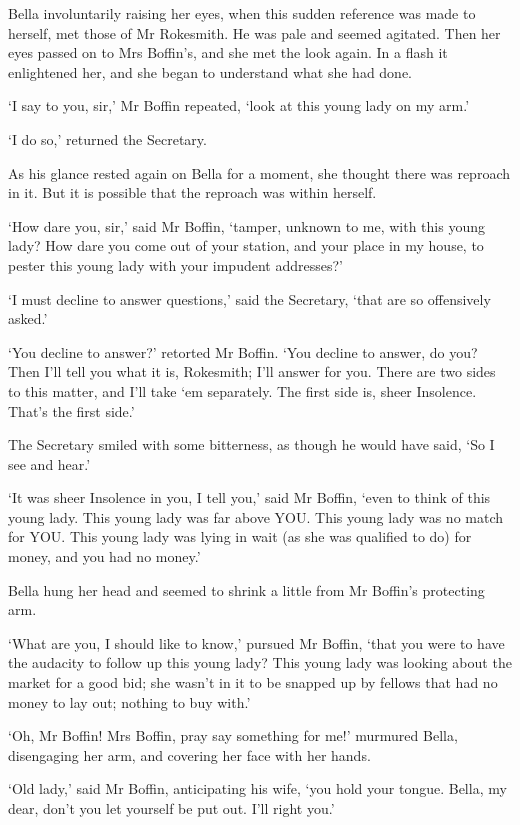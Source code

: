Bella involuntarily raising her eyes, when this sudden reference was
made to herself, met those of Mr Rokesmith. He was pale and seemed
agitated. Then her eyes passed on to Mrs Boffin’s, and she met the look
again. In a flash it enlightened her, and she began to understand what
she had done.

‘I say to you, sir,’ Mr Boffin repeated, ‘look at this young lady on my
arm.’

‘I do so,’ returned the Secretary.

As his glance rested again on Bella for a moment, she thought there was
reproach in it. But it is possible that the reproach was within herself.

‘How dare you, sir,’ said Mr Boffin, ‘tamper, unknown to me, with this
young lady? How dare you come out of your station, and your place in my
house, to pester this young lady with your impudent addresses?’

‘I must decline to answer questions,’ said the Secretary, ‘that are so
offensively asked.’

‘You decline to answer?’ retorted Mr Boffin. ‘You decline to answer,
do you? Then I’ll tell you what it is, Rokesmith; I’ll answer for you.
There are two sides to this matter, and I’ll take ‘em separately. The
first side is, sheer Insolence. That’s the first side.’

The Secretary smiled with some bitterness, as though he would have said,
‘So I see and hear.’

‘It was sheer Insolence in you, I tell you,’ said Mr Boffin, ‘even to
think of this young lady. This young lady was far above YOU. This young
lady was no match for YOU. This young lady was lying in wait (as she was
qualified to do) for money, and you had no money.’

Bella hung her head and seemed to shrink a little from Mr Boffin’s
protecting arm.

‘What are you, I should like to know,’ pursued Mr Boffin, ‘that you were
to have the audacity to follow up this young lady? This young lady was
looking about the market for a good bid; she wasn’t in it to be snapped
up by fellows that had no money to lay out; nothing to buy with.’

‘Oh, Mr Boffin! Mrs Boffin, pray say something for me!’ murmured Bella,
disengaging her arm, and covering her face with her hands.

‘Old lady,’ said Mr Boffin, anticipating his wife, ‘you hold your
tongue. Bella, my dear, don’t you let yourself be put out. I’ll right
you.’

